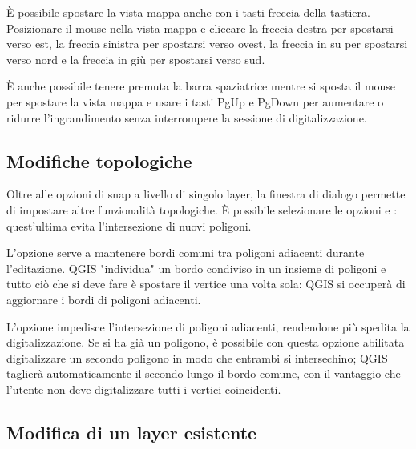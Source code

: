 
È possibile spostare la vista mappa anche con i tasti freccia della tastiera. 
Posizionare il mouse nella vista mappa e cliccare la freccia destra per spostarsi 
verso est, la freccia sinistra per spostarsi verso ovest, la freccia in su per 
spostarsi verso nord e la freccia in giù per spostarsi verso sud.

È anche possibile tenere premuta la barra spaziatrice mentre si sposta il
mouse per spostare la vista mappa e usare i tasti PgUp e PgDown per aumentare
o ridurre l'ingrandimento senza interrompere la sessione di digitalizzazione.

\subsection{Modifiche topologiche}

Oltre alle opzioni di snap a livello di singolo layer, la finestra di dialogo
 \arrow {} 
permette di impostare altre funzionalità topologiche. È possibile selezionare 
le opzioni  e :
quest'ultima evita l'intersezione di nuovi poligoni.


L'opzione  serve a mantenere bordi
comuni tra poligoni adiacenti durante l'editazione. QGIS "individua" un bordo
condiviso in un insieme di poligoni e tutto ciò che si deve fare è spostare il
vertice una volta sola: QGIS si occuperà di aggiornare i bordi di poligoni adiacenti.


L'opzione  impedisce l'intersezione di poligoni adiacenti, 
rendendone più spedita la digitalizzazione. Se si ha già un poligono, è possibile con 
questa opzione abilitata digitalizzare un secondo poligono in modo che entrambi si 
intersechino; QGIS taglierà automaticamente il secondo lungo il bordo comune, con il vantaggio che
l'utente non deve digitalizzare tutti i vertici coincidenti.

\subsection{Modifica di un layer esistente}
\label{sec:edit_existing_layer}

